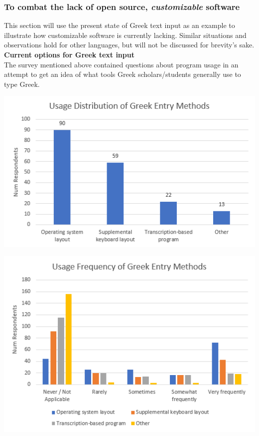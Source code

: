 \documentclass[11pt]{article}
\begin{document}
\subsubsection{To combat the lack of open source, \emph{customizable} software}
\label{sec:orgd41c619}

This section will use the present state of Greek text input as an example to illustrate how customizable software is currently lacking. Similar situations and observations hold for other languages, but will not be discussed for brevity's sake. \\

\noindent \textbf{Current options for Greek text input} \\

The survey mentioned above contained questions about program usage in an attempt to get an idea of what tools Greek scholars/students generally use to type Greek.

\begin{center}
\includegraphics[width=.9\linewidth]{./images/entry-methods.PNG}
\end{center}

\begin{center}
\includegraphics[width=.9\linewidth]{./images/entry-method-usage-distribution.PNG}
\end{center}
\end{document}
